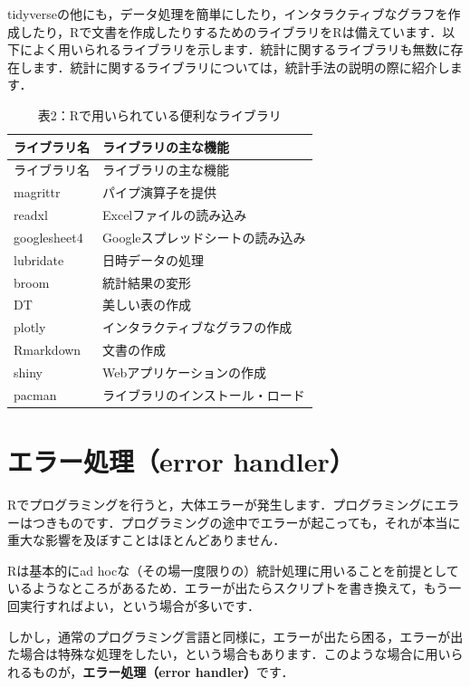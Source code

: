 \documentclass[
  letterpaper,
  DIV=11,
  numbers=noendperiod]{scrreprt}
\begin{document}
tidyverseの他にも，データ処理を簡単にしたり，インタラクティブなグラフを作成したり，Rで文書を作成したりするためのライブラリをRは備えています．以下によく用いられるライブラリを示します．統計に関するライブラリも無数に存在します．統計に関するライブラリについては，統計手法の説明の際に紹介します．

\begin{longtable}[]{@{}ll@{}}
\caption{表2：Rで用いられている便利なライブラリ}\tabularnewline
\toprule()
ライブラリ名 & ライブラリの主な機能 \\
\midrule()
\endfirsthead
\toprule()
ライブラリ名 & ライブラリの主な機能 \\
\midrule()
\endhead
magrittr & パイプ演算子を提供 \\
readxl & Excelファイルの読み込み \\
googlesheet4 & Googleスプレッドシートの読み込み \\
lubridate & 日時データの処理 \\
broom & 統計結果の変形 \\
DT & 美しい表の作成 \\
plotly & インタラクティブなグラフの作成 \\
Rmarkdown & 文書の作成 \\
shiny & Webアプリケーションの作成 \\
pacman & ライブラリのインストール・ロード \\
\bottomrule()
\end{longtable}


\hypertarget{ux30a8ux30e9ux30fcux51e6ux7406error-handler}{%
\chapter{エラー処理（error
handler）}\label{ux30a8ux30e9ux30fcux51e6ux7406error-handler}}

Rでプログラミングを行うと，大体エラーが発生します．プログラミングにエラーはつきものです．プログラミングの途中でエラーが起こっても，それが本当に重大な影響を及ぼすことはほとんどありません．

Rは基本的にad
hocな（その場一度限りの）統計処理に用いることを前提としているようなところがあるため．エラーが出たらスクリプトを書き換えて，もう一回実行すればよい，という場合が多いです．

しかし，通常のプログラミング言語と同様に，エラーが出たら困る，エラーが出た場合は特殊な処理をしたい，という場合もあります．このような場合に用いられるものが，\textbf{エラー処理（error
handler）}です．
\end{document}
